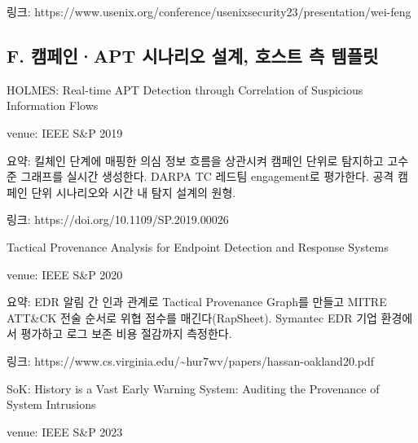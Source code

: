 \par\noindent \textbullet\enspace 링크: https:/\allowbreak{}/\allowbreak{}www.usenix.org/\allowbreak{}conference/\allowbreak{}usenixsecurity23/\allowbreak{}presentation/\allowbreak{}wei-feng


\subsection{F. 캠페인·APT 시나리오 설계, 호스트 측 템플릿}
\par\noindent \textbullet\enspace HOLMES: Real-time APT Detection through Correlation of Suspicious Information Flows


\par\noindent \textbullet\enspace venue: IEEE S\&P 2019


\par\noindent \textbullet\enspace 요약: 킬체인 단계에 매핑한 의심 정보 흐름을 상관시켜 캠페인 단위로 탐지하고 고수준 그래프를 실시간 생성한다. DARPA TC 레드팀 engagement로 평가한다. 공격 캠페인 단위 시나리오와 시간 내 탐지 설계의 원형.


\par\noindent \textbullet\enspace 링크: https:/\allowbreak{}/\allowbreak{}doi.org/\allowbreak{}10.1109/\allowbreak{}SP.2019.00026


\par\noindent \textbullet\enspace Tactical Provenance Analysis for Endpoint Detection and Response Systems


\par\noindent \textbullet\enspace venue: IEEE S\&P 2020


\par\noindent \textbullet\enspace 요약: EDR 알림 간 인과 관계로 Tactical Provenance Graph를 만들고 MITRE ATT\&CK 전술 순서로 위협 점수를 매긴다(RapSheet). Symantec EDR 기업 환경에서 평가하고 로그 보존 비용 절감까지 측정한다.


\par\noindent \textbullet\enspace 링크: https:/\allowbreak{}/\allowbreak{}www.cs.virginia.edu/\allowbreak{}\textasciitilde{}hur7wv/\allowbreak{}papers/\allowbreak{}hassan-oakland20.pdf


\par\noindent \textbullet\enspace SoK: History is a Vast Early Warning System: Auditing the Provenance of System Intrusions


\par\noindent \textbullet\enspace venue: IEEE S\&P 2023


